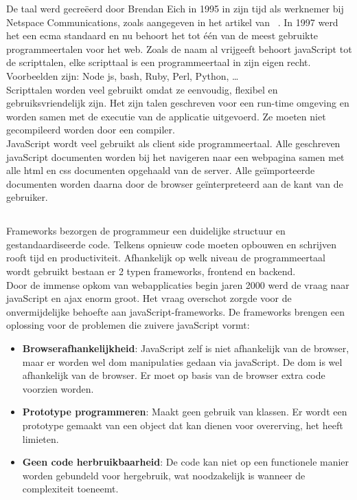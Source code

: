 De taal werd gecreëerd door Brendan Eich in 1995 in zijn tijd als werknemer bij Netspace Communications, zoals aangegeven in het artikel van ~\textcite{Aston2015}. In 1997 werd het een \gls{ecma} standaard en nu behoort het tot één van de meest gebruikte programmeertalen voor het web. Zoals de naam al vrijgeeft behoort javaScript tot de scripttalen, elke scripttaal is een programmeertaal in zijn eigen recht. Voorbeelden zijn: Node js, bash, Ruby, Perl, Python, \dots\\
Scripttalen worden veel gebruikt omdat ze eenvoudig, flexibel en gebruiksvriendelijk zijn. Het zijn talen geschreven voor een run-time omgeving en worden samen met de executie van de applicatie uitgevoerd. Ze moeten niet gecompileerd worden door een compiler.\\
JavaScript wordt veel gebruikt als client side programmeertaal. Alle geschreven javaScript documenten worden bij het navigeren naar een webpagina samen met alle \gls{html} en \gls{css} documenten opgehaald van de server. Alle geïmporteerde documenten worden daarna door de browser geïnterpreteerd aan de kant van de gebruiker.

\subsection{}
\label{sec:jsFrameworks}

Frameworks bezorgen de programmeur een duidelijke structuur en gestandaardiseerde code. Telkens opnieuw code moeten opbouwen en schrijven rooft tijd en productiviteit. Afhankelijk op welk niveau de programmeertaal wordt gebruikt bestaan er 2 typen frameworks, frontend en backend.\\
Door de immense opkom van webapplicaties begin jaren 2000 werd de vraag naar javaScript en \gls{ajax} enorm groot. Het vraag overschot zorgde voor de onvermijdelijke behoefte aan javaScript-frameworks. De frameworks brengen een oplossing voor de problemen die zuivere javaScript vormt:

\begin{itemize}[label={}]
    \item \textbf{Browserafhankelijkheid}:
    JavaScript zelf is niet afhankelijk van de browser, maar er worden wel \gls{dom} manipulaties gedaan via javaScript. De \gls{dom} is wel afhankelijk van de browser. Er moet op basis van de browser extra code voorzien worden. \newline
    \item \textbf{Prototype programmeren}:
    Maakt geen gebruik van klassen. Er wordt een prototype gemaakt van een object dat kan dienen voor overerving, het heeft limieten. \newline
    \item \textbf{Geen code herbruikbaarheid}:
    De code kan niet op een functionele manier worden gebundeld voor hergebruik, wat noodzakelijk is wanneer de complexiteit toeneemt.
\end{itemize}

